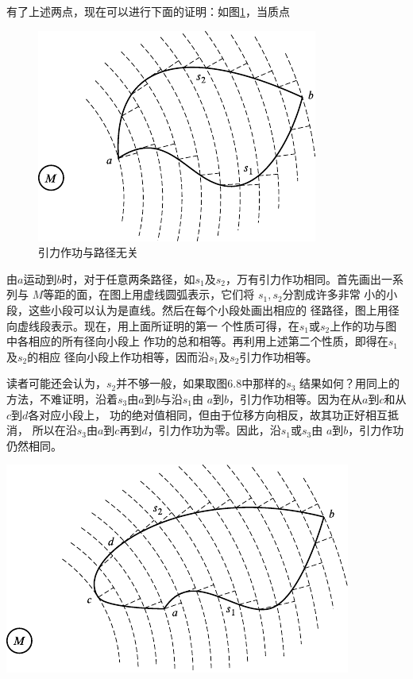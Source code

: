 有了上述两点，现在可以进行下面的证明：如图\ref{fig:06.07}，当质点
\begin{figure}
  \vspace{-1.3em}
  \centering
  \includegraphics{figure/fig06.07}
  \caption{引力作功与路径无关}
  \label{fig:06.07}
\end{figure}
由$ a $运动到$ b $时，对于任意两条路径，如$ s _ { 1 } $及$
  s _ { 2 } $，万有引力作功相同。首先画出一系列与
$ M $等距的面，在图上用虚线圆弧表示，它们将
$ s _ { 1 } , s _ { 2 } $分割成许多非常
小的小段，这些小段可以认为是直线。然后在每个小段处画出相应的
径路径，图上用径向虚线段表示。现在，用上面所证明的第一
个性质可得，在$ s _ { 1 } $或$ s _ { 2 } $上作的功与图中各相应的所有径向小段上
作功的总和相等。再利用上述第二个性质，即得在$ s _ { 1 } $ 及$ s _ { 2 } $的相应
径向小段上作功相等，因而沿$ s _ { 1 } $及$ s _ { 2 } $引力作功相等。

读者可能还会认为，$ s _ { 2 } $并不够一般，如果取图6.8中那样的$ s _ { 3 } $
结果如何？用同上的方法，不难证明，沿着$ s _ { 3 } $由$ a $到$ b $与沿$ s _ { 1 } $由
$ a $到$ b $，引力作功相等。因为在从$ a $到$ c $和从$ c $到$ d $各对应小段上，
功的绝对值相同，但由于位移方向相反，故其功正好相互抵消，
所以在沿$ s _ { 3 } $由$ a $到$ c $再到$ d $，引力作功为零。因此，沿$ s _ { 1 } $或$ s _ { 3 } $由
$ a $到$ b $，引力作功仍然相同。

\begin{figurex}
  \centering
  \includegraphics{figure/fig06.08}
  \caption{引力作功与路径无关}
  \label{fig:06.08}
\end{figurex}

